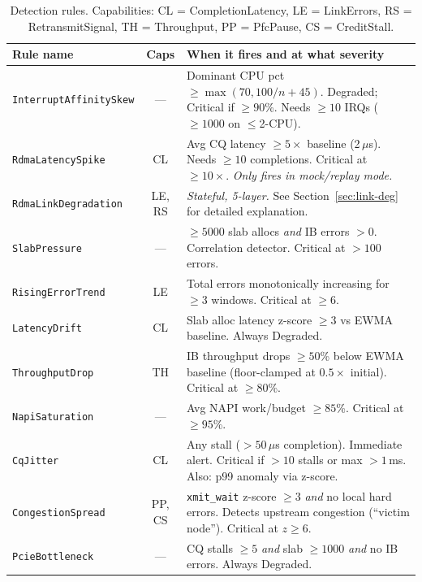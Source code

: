 \documentclass[11pt]{article}
\begin{document}
\begin{table}[h]
\small
\begin{tabularx}{\textwidth}{p{3.6cm}cX}
\toprule
Rule name & Caps & When it fires and at what severity \\
\midrule
\texttt{InterruptAffinitySkew} & --- & Dominant CPU pct $\geq \max(70, 100/n + 45)$. Degraded; Critical if $\geq 90$\%. Needs $\geq 10$ IRQs ($\geq 1000$ on $\leq$2-CPU). \\[4pt]
\texttt{RdmaLatencySpike} & CL & Avg CQ latency $\geq 5\times$ baseline (2\,$\mu$s). Needs $\geq 10$ completions. Critical at $\geq 10\times$. \textit{Only fires in mock/replay mode.} \\[4pt]
\texttt{RdmaLinkDegradation} & LE, RS & \textit{Stateful, 5-layer.} See Section~\ref{sec:link-deg} for detailed explanation. \\[4pt]
\texttt{SlabPressure} & --- & $\geq 5000$ slab allocs \emph{and} IB errors $> 0$. Correlation detector. Critical at $> 100$ errors. \\[4pt]
\texttt{RisingErrorTrend} & LE & Total errors monotonically increasing for $\geq 3$ windows. Critical at $\geq 6$. \\[4pt]
\texttt{LatencyDrift} & CL & Slab alloc latency z-score $\geq 3$ vs EWMA baseline. Always Degraded. \\[4pt]
\texttt{ThroughputDrop} & TH & IB throughput drops $\geq 50$\% below EWMA baseline (floor-clamped at $0.5\times$ initial). Critical at $\geq 80$\%. \\[4pt]
\texttt{NapiSaturation} & --- & Avg NAPI work/budget $\geq 85$\%. Critical at $\geq 95$\%. \\[4pt]
\texttt{CqJitter} & CL & Any stall ($>50\,\mu$s completion). Immediate alert. Critical if $>10$ stalls or max $>1$\,ms. Also: p99 anomaly via z-score. \\[4pt]
\texttt{CongestionSpread} & PP, CS & \texttt{xmit\_wait} z-score $\geq 3$ \emph{and} no local hard errors. Detects upstream congestion (``victim node''). Critical at $z \geq 6$. \\[4pt]
\texttt{PcieBottleneck} & --- & CQ stalls $\geq 5$ \emph{and} slab $\geq 1000$ \emph{and} no IB errors. Always Degraded. \\
\bottomrule
\end{tabularx}
\caption{Detection rules. Capabilities: CL = CompletionLatency, LE = LinkErrors,
RS = RetransmitSignal, TH = Throughput, PP = PfcPause, CS = CreditStall.}
\label{tab:rules}
\end{table}
\end{document}
